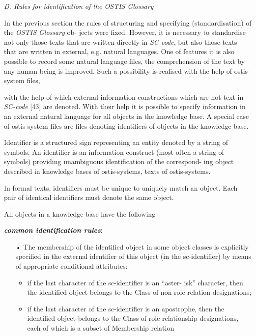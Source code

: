 \documentclass{article}
\begin{document}
\begin{multicols}{2}
\textit{D. Rules for identification of the \textit{OSTIS} Glossary} 

\quad 
In the previous section the rules of structuring and
specifying (standardisation) of the \textit{OSTIS Glossary} ob-
jects were fixed. However, it is necessary to standardise
not only those texts that are written directly in \textit{SC-code}, but also those texts that are written in external, e.g.
natural languages. One of features it is also possible to record some natural
language files, the comprehension
of the text by any human being is improved. Such a
possibility is realised with the help of ostis-system files,

\end{multicols}
\begin{multicols}{2}

with the help of which external information constructions
which are not text in \textit{SC-code} [43] are denoted. With their
help it is possible to specify information in an external
natural language for all objects in the knowledge base.
A special case of ostis-system files are files denoting
identifiers of objects in the knowledge base.

\quad 
Identifier is a structured sign representing an entity
denoted by a string of symbols. An identifier is an
information construct (most often a string of symbols)
providing unambiguous identification of the correspond-
ing object described in knowledge bases of ostis-systems,
texts of ostis-systems.

\quad
In formal texts, identifiers must be unique to uniquely
match an object. Each pair of identical identifiers must
denote the same object.

\quad
All objects in a knowledge base have the following

\textbf{\textit{common identification rules}:}
\begin{itemize}
\item[•]The membership of the identified object in some
object classes is explicitly specified in the external
identifier of this object (in the sc-identifier) by
means of appropriate conditional attributes:
\begin{itemize}
\item if the last character of the sc-identifier is an “aster-
isk” character, then the identified object belongs
to the Class of non-role relation designations;

\item if the last character of the sc-identifier is an
apostrophe, then the identified object belongs to
the Class of role relationship designations, each
of which is a subset of Membership relation


\end{itemize}
\end{itemize}
\end{multicols}
\end{document}
